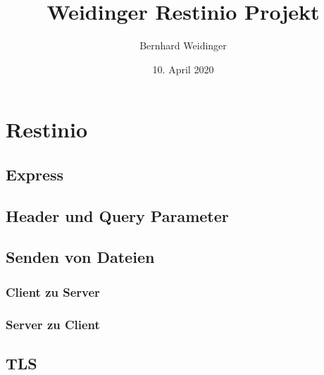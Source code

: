 \documentclass[10pt]{article}
\title{\textbf{Weidinger Restinio Projekt}}
\author{Bernhard Weidinger}
\date{10. April 2020}
\begin{document}
\maketitle
\newpage

\section{Restinio}
\subsection{Express}

\subsection{Header und Query Parameter}

\subsection{Senden von Dateien}
\subsubsection{Client zu Server}

\subsubsection{Server zu Client}

\subsection{TLS}
\end{document}
